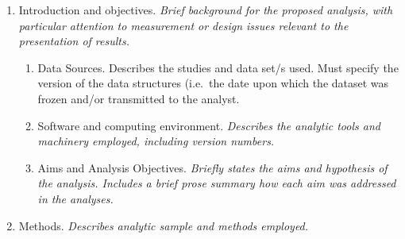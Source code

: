 \documentclass[]{book}
\providecommand{\tightlist}{%
  \setlength{\itemsep}{0pt}\setlength{\parskip}{0pt}}
\begin{document}
\begin{enumerate}
\def\labelenumi{\arabic{enumi}.}
\tightlist
\item
  Introduction and objectives. \emph{Brief background for the proposed
  analysis, with particular attention to measurement or design issues
  relevant to the presentation of results.}

  \begin{enumerate}
  \def\labelenumii{\alph{enumii}.}
  \tightlist
  \item
    Data Sources. Describes the studies and data set/s used. Must
    specify the version of the data structures (i.e.~the date upon which
    the dataset was frozen and/or transmitted to the analyst.
  \item
    Software and computing environment. \emph{Describes the analytic
    tools and machinery employed, including version numbers.}
  \item
    Aims and Analysis Objectives. \emph{Briefly states the aims and
    hypothesis of the analysis. Includes a brief prose summary how each
    aim was addressed in the analyses.}
  \end{enumerate}
\item
  Methods. \emph{Describes analytic sample and methods employed.}


\end{enumerate}
\end{document}
